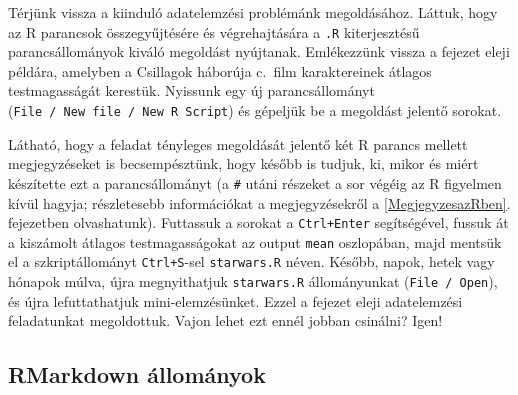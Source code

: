 \documentclass[
]{book}
\newenvironment{Shaded}{\begin{snugshade}}{\end{snugshade}}
\newcommand{\AttributeTok}[1]{\textcolor[rgb]{0.77,0.63,0.00}{#1}}
\newcommand{\CommentTok}[1]{\textcolor[rgb]{0.56,0.35,0.01}{\textit{#1}}}
\newcommand{\FunctionTok}[1]{\textcolor[rgb]{0.00,0.00,0.00}{#1}}
\newcommand{\NormalTok}[1]{#1}
\newcommand{\SpecialCharTok}[1]{\textcolor[rgb]{0.00,0.00,0.00}{#1}}
\newcommand{\StringTok}[1]{\textcolor[rgb]{0.31,0.60,0.02}{#1}}
\begin{document}
Térjünk vissza a kiinduló adatelemzési problémánk megoldásához. Láttuk, hogy az R parancsok összegyűjtésére és végrehajtására a \texttt{.R} kiterjesztésű parancsállományok kiváló megoldást nyújtanak. Emlékezzünk vissza a fejezet eleji példára, amelyben a Csillagok háborúja c.~film karaktereinek átlagos testmagasságát kerestük. Nyissunk egy új parancsállományt (\texttt{File\ /\ New\ file\ /\ New\ R\ Script}) és gépeljük be a megoldást jelentő sorokat.

\begin{Shaded}
\end{Shaded}

Látható, hogy a feladat tényleges megoldását jelentő két R parancs mellett megjegyzéseket is becsempésztünk, hogy később is tudjuk, ki, mikor és miért készítette ezt a parancsállományt (a \texttt{\#} utáni részeket a sor végéig az R figyelmen kívül hagyja; részletesebb információkat a megjegyzésekről a \ref{MegjegyzesazRben}. fejezetben olvashatunk). Futtassuk a sorokat a \texttt{Ctrl+Enter} segítségével, fussuk át a kiszámolt átlagos testmagasságokat az output \texttt{mean} oszlopában, majd mentsük el a szkriptállományt \texttt{Ctrl+S}-sel \texttt{starwars.R} néven. Később, napok, hetek vagy hónapok múlva, újra megnyithatjuk \texttt{starwars.R} állományunkat (\texttt{File\ /\ Open}), és újra lefuttathatjuk mini-elemzésünket. Ezzel a fejezet eleji adatelemzési feladatunkat megoldottuk. Vajon lehet ezt ennél jobban csinálni? Igen!

\hypertarget{rmarkdown-allomanyok}{%
\subsection{RMarkdown állományok}\label{rmarkdown-allomanyok}}
\end{document}

